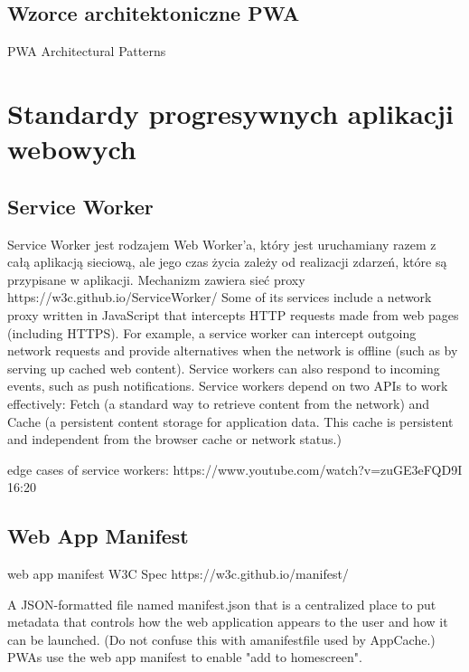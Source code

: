 \documentclass[a4paper,12pt,twoside,openany]{report}
\begin{document}
\subsection*{Wzorce architektoniczne PWA}
PWA Architectural Patterns
\section{Standardy progresywnych aplikacji webowych}
\subsection{Service Worker} \label{subs:sw}
Service Worker jest rodzajem Web Worker'a, który jest uruchamiany razem z całą aplikacją sieciową, ale jego czas życia zależy od realizacji zdarzeń, które są przypisane w aplikacji. Mechanizm zawiera sieć proxy 
https://w3c.github.io/ServiceWorker/
Some of its services include a network proxy written in JavaScript that intercepts HTTP requests made from web pages (including HTTPS). For example, a service worker can intercept outgoing network requests and provide alternatives when the network is offline (such as by serving up cached web content). Service workers can also respond to incoming events, such as push notifications.
Service workers depend on two APIs to work effectively: Fetch (a standard way to retrieve content from the network) and Cache (a persistent content storage for application data. This cache is persistent and independent from the browser cache or network status.)

edge cases of service workers:
https://www.youtube.com/watch?v=zuGE3eFQD9I 16:20

\subsection{Web App Manifest} \label{subs:manifest}
web app manifest W3C Spec https://w3c.github.io/manifest/

A JSON-formatted file named manifest.json that is a centralized place to put metadata that controls how the web application appears to the user and how it can be launched. (Do not confuse this with amanifestfile used by AppCache.) PWAs use the web app manifest to enable "add to homescreen".
\end{document}
